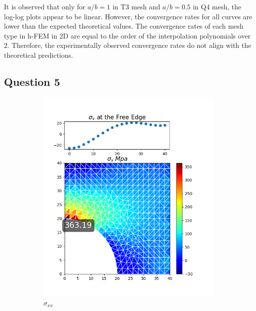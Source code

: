 \documentclass[twoside,twocolumn,10pt]{article}
\begin{document}
It is observed that only for \(a/b = 1\) in T3 mesh and \(a/b = 0.5\) in Q4 mesh, the log-log plots appear to be linear. However, the convergence rates for all curves are lower than the expected theoretical values. The convergence rates of each mesh type in h-FEM in 2D are equal to the order of the interpolation polynomials over 2.  Therefore, the experimentally observed convergence rates do not align with the theoretical predictions. 
 
\subsection{Question 5}
\begin{figure}[!ht]
  \begin{subfigure}[c]{0.26\textwidth}
    \includegraphics[width=1.\linewidth]{Q2_5/Q5_1_x_triangle.png}
    \caption{$\sigma_{xx}$}
    \label{fig:x_tri_1}
  \end{subfigure}%
  \begin{subfigure}[c]{0.26\textwidth}

\end{subfigure}
\end{figure}
\end{document}
